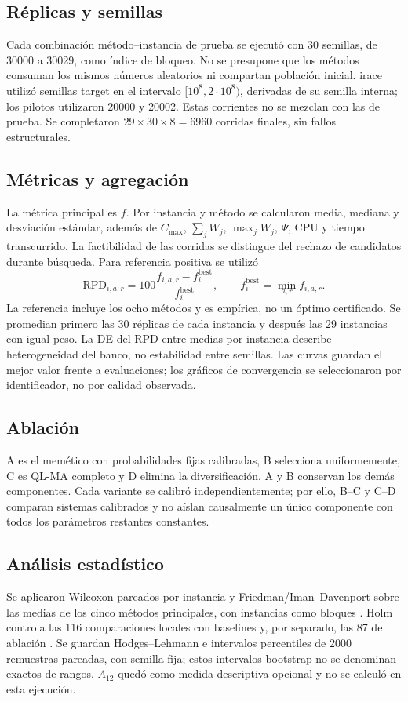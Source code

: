 \documentclass[11pt,a4paper]{article}
\newcommand{\Cmax}{C_{\max}}
\begin{document}
\subsection{Réplicas y semillas}
Cada combinación método--instancia de prueba se ejecutó con 30 semillas, de 30000 a 30029, como índice de bloqueo. No se presupone que los métodos consuman los mismos números aleatorios ni compartan población inicial. irace utilizó semillas target en el intervalo $[10^8,2\cdot10^8)$, derivadas de su semilla interna; los pilotos utilizaron 20000 y 20002. Estas corrientes no se mezclan con las de prueba. Se completaron $29\times30\times8=6960$ corridas finales, sin fallos estructurales.

\subsection{Métricas y agregación}
La métrica principal es $f$. Por instancia y método se calcularon media, mediana y desviación estándar, además de $\Cmax$, $\sum_jW_j$, $\max_jW_j$, $\Psi$, CPU y tiempo transcurrido. La factibilidad de las corridas se distingue del rechazo de candidatos durante búsqueda. Para referencia positiva se utilizó
\begin{equation}
\mathrm{RPD}_{i,a,r}=100\frac{f_{i,a,r}-f_i^{\mathrm{best}}}{f_i^{\mathrm{best}}},\qquad
f_i^{\mathrm{best}}=\min_{a,r}f_{i,a,r}.
\end{equation}
La referencia incluye los ocho métodos y es empírica, no un óptimo certificado. Se promedian primero las 30 réplicas de cada instancia y después las 29 instancias con igual peso. La DE del RPD entre medias por instancia describe heterogeneidad del banco, no estabilidad entre semillas. Las curvas guardan el mejor valor frente a evaluaciones; los gráficos de convergencia se seleccionaron por identificador, no por calidad observada.

\subsection{Ablación}
A es el memético con probabilidades fijas calibradas, B selecciona uniformemente, C es QL-MA completo y D elimina la diversificación. A y B conservan los demás componentes. Cada variante se calibró independientemente; por ello, B--C y C--D comparan sistemas calibrados y no aíslan causalmente un único componente con todos los parámetros restantes constantes.

\subsection{Análisis estadístico}
Se aplicaron Wilcoxon pareados por instancia y Friedman/Iman--Davenport sobre las medias de los cinco métodos principales, con instancias como bloques \cite{derrac,iman}. Holm controla las 116 comparaciones locales con baselines y, por separado, las 87 de ablación \cite{garcia}. Se guardan Hodges--Lehmann e intervalos percentiles de 2000 remuestras pareadas, con semilla fija; estos intervalos bootstrap no se denominan exactos de rangos. $A_{12}$ \cite{vargha} quedó como medida descriptiva opcional y no se calculó en esta ejecución.
\end{document}
